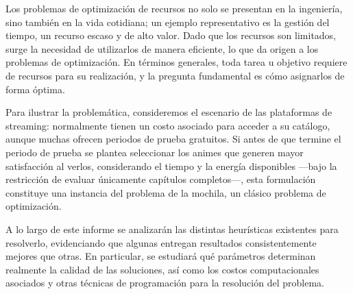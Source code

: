 Los problemas de optimización de recursos no solo se presentan en la ingeniería, sino también en la vida cotidiana; un ejemplo representativo es la gestión del tiempo, un recurso escaso y de alto valor. Dado que los recursos son limitados, surge la necesidad de utilizarlos de manera eficiente, lo que da origen a los problemas de optimización. En términos generales, toda tarea u objetivo requiere de recursos para su realización, y la pregunta fundamental es cómo asignarlos de forma óptima.

Para ilustrar la problemática, consideremos el escenario de las plataformas de streaming: normalmente tienen un costo asociado para acceder a su catálogo, aunque muchas ofrecen periodos de prueba gratuitos. Si antes de que termine el periodo de prueba se plantea seleccionar los animes que generen mayor satisfacción al verlos, considerando el tiempo y la energía disponibles —bajo la restricción de evaluar únicamente capítulos completos—, esta formulación constituye una instancia del problema de la mochila, un clásico problema de optimización.

A lo largo de este informe se analizarán las distintas heurísticas existentes para resolverlo, evidenciando que algunas entregan resultados consistentemente mejores que otras. En particular, se estudiará qué parámetros determinan realmente la calidad de las soluciones, así como los costos computacionales asociados y otras técnicas de programación para la resolución del problema.
